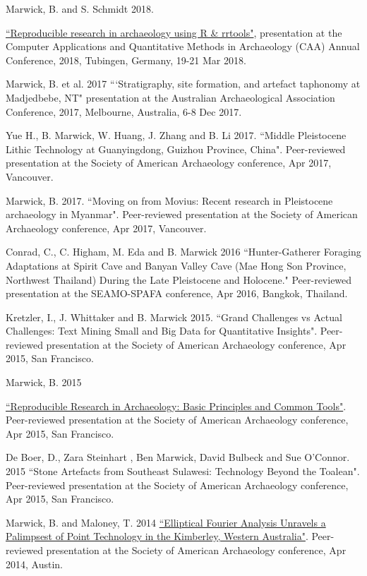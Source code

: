 \ind Marwick, B. and S. Schmidt 2018.  {\href{https://github.com/benmarwick/caa2018-Tubingen}{``Reproducible research in archaeology using R \& rrtools"}, presentation at the Computer Applications and Quantitative Methods in Archaeology (CAA) Annual Conference, 2018, Tubingen, Germany, 19-21 Mar 2018.

\ind  Marwick, B. et al. 2017 ```Stratigraphy, site formation, and artefact taphonomy at Madjedbebe, NT"  presentation at the Australian Archaeological Association Conference, 2017, Melbourne, Australia, 6-8 Dec 2017.

\ind  Yue H., B. Marwick, W. Huang, J. Zhang and B. Li  2017. ``Middle Pleistocene Lithic Technology at Guanyingdong, Guizhou Province, China".  Peer-reviewed presentation at the Society of American Archaeology conference, Apr 2017, Vancouver.

\ind  Marwick, B. 2017. ``Moving on from Movius: Recent research in Pleistocene archaeology in Myanmar".  Peer-reviewed presentation at the Society of American Archaeology conference, Apr 2017, Vancouver.

\ind Conrad, C., C. Higham, M. Eda and B. Marwick 2016 ``Hunter-Gatherer Foraging Adaptations at Spirit Cave and Banyan Valley Cave (Mae Hong Son Province, Northwest Thailand) During the Late Pleistocene and Holocene." Peer-reviewed presentation at the SEAMO-SPAFA conference, Apr 2016, Bangkok, Thailand.

\ind Kretzler, I., J. Whittaker and B. Marwick 2015. ``Grand Challenges vs Actual Challenges: Text Mining Small and Big Data for Quantitative Insights".  Peer-reviewed presentation at the Society of American Archaeology conference, Apr 2015, San Francisco.

\ind Marwick, B. 2015 {\href{https://github.com/benmarwick/SAA2015-Open-Methods}{``Reproducible Research in Archaeology: Basic Principles and Common Tools"}. Peer-reviewed presentation at the Society of American Archaeology conference, Apr 2015, San Francisco.

\ind De Boer, D., Zara Steinhart , Ben Marwick, David Bulbeck and Sue O'Connor. 2015 ``Stone Artefacts from Southeast Sulawesi: Technology Beyond the Toalean". Peer-reviewed presentation at the Society of American Archaeology conference, Apr 2015, San Francisco.

\ind Marwick, B. and Maloney, T. 2014 {\href{https://github.com/benmarwick/marwick-and-maloney-saa2014}{``Elliptical Fourier Analysis Unravels a Palimpsest of Point Technology  in the Kimberley, Western Australia"}}. Peer-reviewed presentation at the Society of American Archaeology conference, Apr 2014, Austin.

}}
